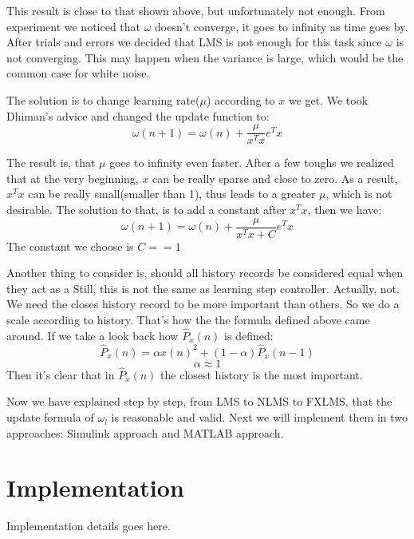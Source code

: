 \documentclass[conference,compsoc]{IEEEtran}
\begin{document}
\par 
	This result is close to that shown above, but unfortunately not enough.
	From experiment we noticed that $\omega$ doesn't converge, it goes to infinity as time goes by.\\
	After trials and errors we decided that LMS is not enough for this task since $\omega$ is not converging.
	This may happen when the variance is large\cite{Dhiman2013Comparison}, 
	which would be the common case for white noise. 
\par 
	The solution is to change learning rate($\mu$) according to $x$ we get. We took Dhiman's advice and changed the update function to:
	$$\omega(n+1) = \omega(n) + \frac{\mu}{x^Tx}e^Tx$$
\par 
	The result is, that $\mu$ goes to infinity even faster. After a few toughs we realized that at the very beginning, $x$ can be really sparse and close to zero.
	As a result, $x^Tx$ can be really small(smaller than 1), thus leads to a greater $\mu$, which is not desirable.
	The solution to that, is to add a constant after $x^Tx$, then we have:
	$$\omega(n+1) = \omega(n) + \frac{\mu}{x^Tx+C}e^Tx$$
	The constant we choose is $C==1$
\par 
	Another thing to consider is, should all history records be considered equal 
	when they act as a Still, this is not the same as learning step controller.
	Actually, not. We need the closes history record to be more important than others.
	So we do a scale according to history. 
	That's how the the formula defined above came around. 
	If we take a look back how $\widehat P_x(n)$ is defined:
	$$ \widehat P_x(n) = \alpha x(n)^2 + (1-\alpha)\widehat P_x(n-1)$$
	$$ \alpha \approx 1$$
	Then it's clear that in $ \widehat P_x(n) $ the closest history is the most important.
\par
	Now we have explained step by step, from LMS to NLMS to FXLMS, that the update formula of $\omega_l$ is
	reasonable and valid. Next we will implement them in two approaches: Simulink approach and MATLAB approach.

\section{Implementation}
Implementation details goes here.
\end{document}
